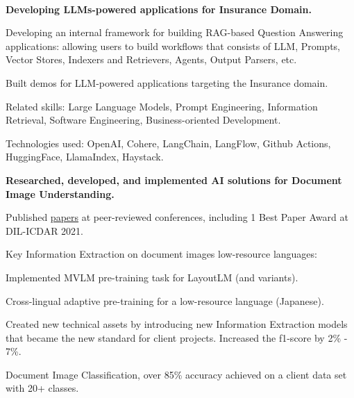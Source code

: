 \\
\begin{xitemize}
    \item \textbf{Developing LLMs-powered applications for Insurance Domain.}
    \begin{zitemize}
        \item Developing an internal framework for building RAG-based Question Answering applications: allowing
        users to build workflows that consists of LLM, Prompts, Vector Stores, Indexers and Retrievers,
        Agents, Output Parsers, etc.
        \item Built demos for LLM-powered applications targeting the Insurance domain.
        \item Related skills: Large Language Models, Prompt Engineering, Information Retrieval, Software
        Engineering, Business-oriented Development.
        \item Technologies used: OpenAI, Cohere, LangChain, LangFlow, Github Actions, HuggingFace, LlamaIndex, Haystack.
    \end{zitemize}
    \item \textbf{Researched, developed, and implemented AI solutions for Document Image Understanding.}
    \begin{zitemize}
        \item Published \href{https://scholar.google.com/citations?user=\gscholarid}{papers} at
        peer-reviewed conferences, including 1 Best Paper Award at DIL-ICDAR 2021.
        \item Key Information Extraction on document images low-resource languages:
        \vspace{.2em}
        \begin{zitemize}
            \item Implemented MVLM pre-training task for LayoutLM (and variants).
            \item Cross-lingual adaptive pre-training for a low-resource language (Japanese).
            \item Created new technical assets by introducing new Information Extraction models that
            became the new standard for client projects. Increased the f1-score by 2\% - 7\%.
        \end{zitemize}
        \item Document Image Classification, over 85\% accuracy achieved on a client data set with 20+ classes.

\end{zitemize}
\end{xitemize}
